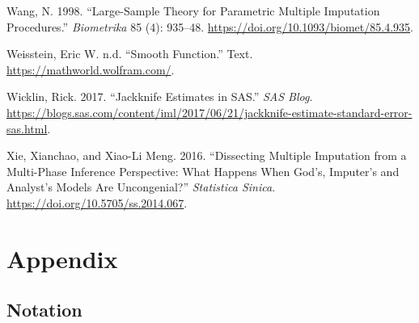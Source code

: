 \documentclass[
  letterpaper,
  DIV=11,
  numbers=noendperiod]{scrreprt}
\newlength{\cslhangindent}
\newlength{\cslentryspacingunit} %
\newenvironment{CSLReferences}[2] %
 {%
  \setlength{\parindent}{0pt}
  \ifodd #1
  \let\oldpar\par
  \def\par{\hangindent=\cslhangindent\oldpar}
  \fi
  \setlength{\parskip}{#2\cslentryspacingunit}
 }%
 {}
\begin{document}
\begin{CSLReferences}{1}{0}
\leavevmode{}%
Wang, N. 1998. {``Large-Sample Theory for Parametric Multiple Imputation
Procedures.''} \emph{Biometrika} 85 (4): 935--48.
\url{https://doi.org/10.1093/biomet/85.4.935}.

\leavevmode{}%
Weisstein, Eric W. n.d. {``Smooth Function.''} Text.
\url{https://mathworld.wolfram.com/}.

\leavevmode{}%
Wicklin, Rick. 2017. {``Jackknife Estimates in SAS.''} \emph{SAS Blog}.
\url{https://blogs.sas.com/content/iml/2017/06/21/jackknife-estimate-standard-error-sas.html}.

\leavevmode{}%
Xie, Xianchao, and Xiao-Li Meng. 2016. {``Dissecting Multiple Imputation
from a Multi-Phase Inference Perspective: What Happens When God's,
Imputer's and Analyst's Models Are Uncongenial?''} \emph{Statistica
Sinica}. \url{https://doi.org/10.5705/ss.2014.067}.

\end{CSLReferences}


\hypertarget{appendix}{%
\chapter*{Appendix}\label{appendix}}

\hypertarget{notation}{%
\section*{Notation}\label{notation}}
\end{document}
